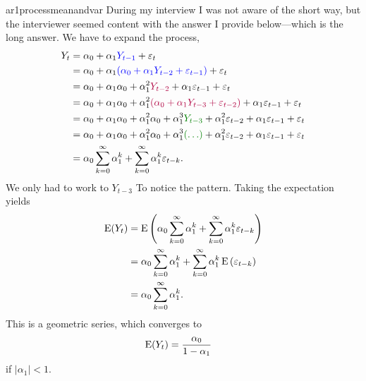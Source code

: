 \begin{answer}{ar1processmeanandvar}
During my interview I was not aware of the short way, but the interviewer seemed content with the answer I provide below---which is the long answer.
We have to expand the process,
\begin{align*}
  Y_t &=
  \alpha_0 + \alpha_1
  \textcolor{blue}{Y_{t-1}} + \varepsilon_{t} \\
      &=
  \alpha_0 + \alpha_1
  \textcolor{blue}{(
  \alpha_0 + \alpha_1 Y_{t-2} + \varepsilon_{t-1}
  )}
                       + \varepsilon_{t} \\
      &=
  \alpha_0 + \alpha_1
  \alpha_0 + \alpha_1^2 \textcolor{dwred}{Y_{t-2}} + \alpha_1\varepsilon_{t-1}
                       + \varepsilon_{t} \\
      &=
  \alpha_0 + \alpha_1
  \alpha_0 + \alpha_1^2
  \textcolor{dwred}{(
  \alpha_0 + \alpha_1 Y_{t-3} + \varepsilon_{t-2}
  )
  }
                         + \alpha_1\varepsilon_{t-1}
                        + \varepsilon_{t} \\
      &=
  \alpha_0 + \alpha_1
  \alpha_0 + \alpha_1^2
  \alpha_0 + \alpha_1^3 \textcolor{dwgreen}{Y_{t-3}} + \alpha_1^2\varepsilon_{t-2}
                        + \alpha_1\varepsilon_{t-1}
                        + \varepsilon_{t} \\
      &=
  \alpha_0 + \alpha_1
  \alpha_0 + \alpha_1^2
  \alpha_0 + \alpha_1^3
  \textcolor{dwgreen}{(\ldots)} + \alpha_1^2\varepsilon_{t-2}
                        + \alpha_1\varepsilon_{t-1}
                        + \varepsilon_{t} \\
      &=
  \alpha_0
  \sum_{k=0}^{\infty}
  {\alpha_1^k}
  +
  \sum_{k=0}^{\infty}{
    \alpha_1^k
    \varepsilon_{t-k}
    }
    \text{.}
\end{align*}
We only had to work to
$Y_{t-3}$
To notice the pattern.
Taking the expectation yields
\begin{align*}
\operatorname{\mathrm{E}}(Y_t)
&=
\operatorname{\mathrm{E}}\left(
  \alpha_0
  \sum_{k=0}^{\infty}
  {\alpha_1^k}
  +
  \sum_{k=0}^{\infty}{
    \alpha_1^k
    \varepsilon_{t-k}
    }
    \right) \\
&=
  \alpha_0
  \sum_{k=0}^{\infty}
  {\alpha_1^k}
  +
  \sum_{k=0}^{\infty}{
    \alpha_1^k
\operatorname{\mathrm{E}}\left(
    \varepsilon_{t-k}
    \right)
    } \\
&=
  \alpha_0
  \sum_{k=0}^{\infty}
  {\alpha_1^k}
  \text{.}
\end{align*}
This is a geometric series, which converges to
\begin{align*}
\operatorname{\mathrm{E}}(Y_t)
&=
  \frac{\alpha_0}{1-\alpha_1}
\end{align*}
if
$|\alpha_1| < 1$.

\end{answer}
